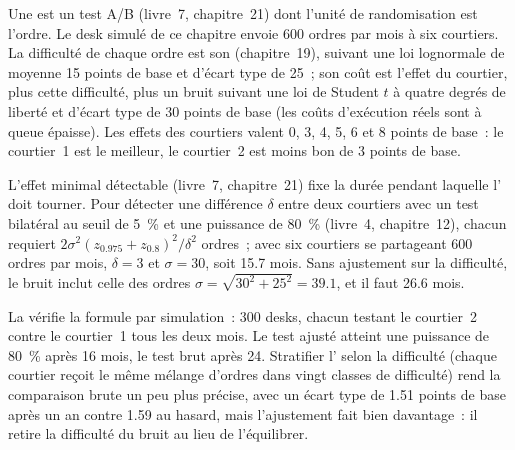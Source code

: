 Une  est un test A/B (livre~7, chapitre~21) dont l'unité de randomisation est l'ordre. Le desk simulé de ce chapitre envoie 600 ordres par
mois à six courtiers. La difficulté de chaque ordre est son  (chapitre~19), suivant une loi lognormale de moyenne 15 points de base et d'écart type
de 25~; son coût est l'effet du courtier, plus cette difficulté, plus un bruit suivant une loi de Student $t$ à quatre degrés de liberté et d'écart type
de 30 points de base (les coûts d'exécution réels sont à queue épaisse). Les effets des courtiers valent 0, 3, 4, 5, 6 et 8 points de base~: le courtier~1 est le meilleur, le courtier~2 est moins bon de 3
points de base.

L'effet minimal détectable (livre~7, chapitre~21) fixe la durée pendant laquelle l' doit tourner. Pour détecter une différence $\delta$ entre deux courtiers avec
un test bilatéral au seuil de 5~\% et une puissance de 80~\% (livre~4, chapitre~12), chacun requiert $2\sigma^2(z_{0.975}+z_{0.8})^2/\delta^2$ ordres~; avec six
courtiers se partageant 600 ordres par mois, $\delta=3$ et $\sigma=30$, soit 15.7 mois. Sans ajustement sur la difficulté, le bruit inclut celle des ordres
$\sigma=\sqrt{30^2+25^2}=39.1$, et il faut 26.6 mois.

\label{lst:mx:the-buy-side-trading-desk-and-its-brokers:months}

La  vérifie la formule par simulation~: 300 desks, chacun testant le courtier~2 contre le courtier~1
tous les deux mois. Le test ajusté atteint une puissance de 80~\% après 16 mois, le test brut après 24. Stratifier l' selon la difficulté (chaque courtier reçoit le
même mélange d'ordres dans vingt classes de difficulté) rend la comparaison brute un peu plus précise, avec un écart type de 1.51 points de base après un
an contre 1.59 au hasard, mais l'ajustement fait bien davantage~: il retire la difficulté du bruit au lieu de l'équilibrer.

